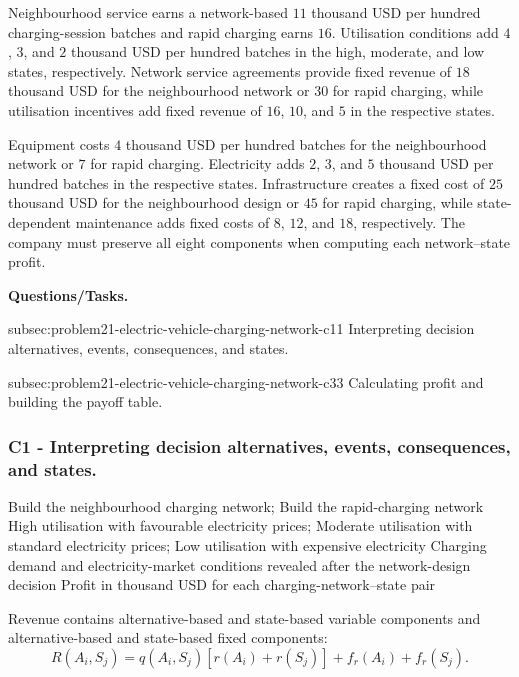 	Neighbourhood service earns a network-based \(11\) thousand USD per hundred charging-session batches and rapid charging earns \(16\). Utilisation conditions add \(4\), \(3\), and \(2\) thousand USD per hundred batches in the high, moderate, and low states, respectively. Network service agreements provide fixed revenue of \(18\) thousand USD for the neighbourhood network or \(30\) for rapid charging, while utilisation incentives add fixed revenue of \(16\), \(10\), and \(5\) in the respective states.

	Equipment costs \(4\) thousand USD per hundred batches for the neighbourhood network or \(7\) for rapid charging. Electricity adds \(2\), \(3\), and \(5\) thousand USD per hundred batches in the respective states. Infrastructure creates a fixed cost of \(25\) thousand USD for the neighbourhood design or \(45\) for rapid charging, while state-dependent maintenance adds fixed costs of \(8\), \(12\), and \(18\), respectively. The company must preserve all eight components when computing each network--state profit.

	\textbf{Questions/Tasks.}
	\begin{enumerate}
		\CriterionTask
		{subsec:problem21-electric-vehicle-charging-network-c1}{1}
		{Interpreting decision alternatives, events, consequences, and states.}

		\CriterionTask
		{subsec:problem21-electric-vehicle-charging-network-c3}{3}
		{Calculating profit and building the payoff table.}
	\end{enumerate}

	\subsubsection*{C1 - Interpreting decision alternatives, events, consequences, and states.}
	\label{subsec:problem21-electric-vehicle-charging-network-c1}

	\DecisionElementsTable
	{Build the neighbourhood charging network; Build the rapid-charging network}
	{High utilisation with favourable electricity prices; Moderate utilisation with standard electricity prices; Low utilisation with expensive electricity}
	{Charging demand and electricity-market conditions revealed after the network-design decision}
	{Profit in thousand USD for each charging-network--state pair}

	Revenue contains alternative-based and state-based variable components and
	alternative-based and state-based fixed components:
	\[
	R(A_i,S_j)
	=
	q(A_i,S_j)
	\left[
	r(A_i)+r(S_j)
	\right]
	+
	f_r(A_i)
	+
	f_r(S_j).
	\]

